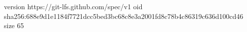 version https://git-lfs.github.com/spec/v1
oid sha256:688e9d1e1184f7721dcc5bed3bc68c8e3a2001fd8c78b4c86319c636d100cd46
size 65
